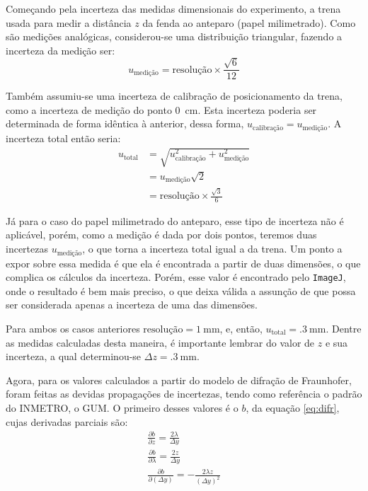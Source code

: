 Começando pela incerteza das medidas dimensionais do experimento, a trena usada para medir a distância $z$ da fenda ao anteparo (papel milimetrado). Como são medições analógicas, considerou-se uma distribuição triangular, fazendo a incerteza da medição ser:
\begin{equation*}
    u_\text{medição} = \text{resolução} \times \frac{\sqrt{6}}{12}
\end{equation*}

Também assumiu-se uma incerteza de calibração de posicionamento da trena, como a incerteza de medição do ponto \SI{0}{\centi\meter}. Esta incerteza poderia ser determinada de forma idêntica à anterior, dessa forma, $u_\text{calibração} = u_\text{medição}$. A incerteza total então seria:
\begin{align*}
    u_\text{total}
        &= \sqrt{u_\text{calibração}^2 + u_\text{medição}^2} \\
        &= u_\text{medição} \sqrt{2} \\
        &= \text{resolução} \times \frac{\sqrt{3}}{6}
\end{align*}

Já para o caso do papel milimetrado do anteparo, esse tipo de incerteza não é aplicável, porém, como a medição é dada por dois pontos, teremos duas incertezas $u_\text{medição}$, o que torna a incerteza total igual a da trena. Um ponto a expor sobre essa medida é que ela é encontrada a partir de duas dimensões, o que complica os cálculos da incerteza. Porém, esse valor é encontrado pelo \texttt{ImageJ}\cite{ref:imagej}, onde o resultado é bem mais preciso, o que deixa válida a assunção de que possa ser considerada apenas a incerteza de uma das dimensões.

Para ambos os casos anteriores $\text{resolução} = \SI{1}{\milli\meter}$, e, então, $u_\text{total} = \SI{.3}{\milli\meter}$. Dentre as medidas calculadas desta maneira, é importante lembrar do valor de $z$ e sua incerteza, a qual determinou-se $\Delta z = \SI{.3}{\milli\meter}$.

Agora, para os valores calculados a partir do modelo de difração de Fraunhofer, foram feitas as devidas propagações de incertezas, tendo como referência o padrão do INMETRO, o GUM\cite{ref:gum}. O primeiro desses valores é o $b$, da equação \ref{eq:difr}, cujas derivadas parciais são:
\begin{gather*}
    \frac{\partial b}{\partial z} = \frac{2 \lambda}{\Delta y} \\
    \frac{\partial b}{\partial \lambda} = \frac{2 z}{\Delta y} \\
    \frac{\partial b}{\partial (\Delta y)} = -\frac{2 \lambda z}{(\Delta y)^2}
\end{gather*}

